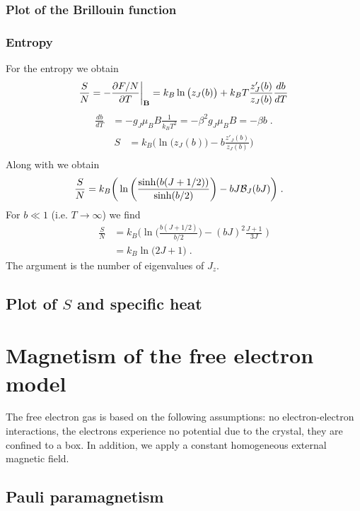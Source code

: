 \subsubsection{Plot of the Brillouin function}
\subsubsection{Entropy}
%
For the entropy we obtain
\begin{align*}
\frac{S}{N} &=-\frac{\partial F/N}{\partial T}\bigg|_{\mathbf B} = k_{B} \ln\big(z_{J}(b)\big)
+k_{B}T \frac{z'_{J}(b)}{z_{J}(b)} \frac{d b}{dT}\\
\end{align*}
%
%
\begin{align*}
 \frac{d b}{dT} &=  -g_{J}\mu_{B} B \frac{1}{k_{B}T^{2}}
 = -\beta^{2} g_{J}\mu_{B} B = - \beta b\;.
\end{align*}
%
\begin{align*}
S &= k_{B} \bigg(\ln\big(z_{J}(b)\big)
-b\frac{z'_{J}(b)}{z_{J}(b)} \bigg)\\
\end{align*}
Along with  we obtain
\begin{align*}
\frac{S}{N} &= k_{B} \bigg(\ln\bigg(
\frac{\sinh(b (J+1/2))}{\sinh(b/2)}
\bigg)
-b J{\cal B}_{J}(b J) \bigg)\;.
\end{align*}
For  $b \ll 1$ (i.e. $T\to \infty$) we find 
%
\begin{align*}
\frac{S}{N} &=  k_{B} \bigg(\ln\bigg(
\frac{b(J+1/2)}{b/2}
\bigg)
-(b J)^{2} \frac{J+1}{3J}\; \bigg)\\
&=k_{B} \ln\big(2J+1\big)\;.
\end{align*}
%
The argument is the number of eigenvalues of $J_{z}$.
\subsection{Plot of $S$ and specific heat}
\section{Magnetism of the free electron model}
The free electron gas is based on the following assumptions: no electron-electron interactions, 
the electrons experience no potential due to the crystal, they  are confined to a box. In addition,
we apply a constant homogeneous external magnetic field. 


\subsection{Pauli paramagnetism}

